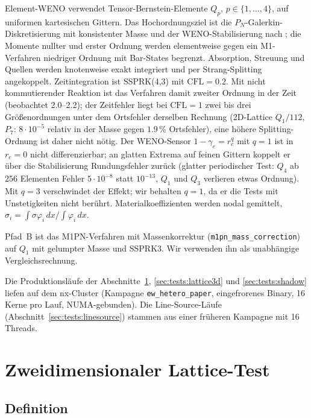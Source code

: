 Element-WENO verwendet Tensor-Bernstein-Elemente $Q_p$, $p\in\{1,\dots,4\}$, auf uniformen
kartesischen Gittern. Das Hochordnungsziel ist die $P_N$-Galerkin-Diskretisierung mit konsistenter
Masse und der WENO-Stabilisierung nach \cite{kuzmin_hajduk_vedral_2025}; die Momente nullter und
erster Ordnung werden elementweise gegen ein M1-Verfahren niedriger Ordnung mit Bar-States
\cite{moujaes_2025} begrenzt. Absorption, Streuung und Quellen werden knotenweise exakt integriert
und per Strang-Splitting angekoppelt. Zeitintegration ist SSPRK(4,3) mit $\mathrm{CFL}=0.2$.
Mit nicht kommutierender Reaktion ist das Verfahren damit zweiter Ordnung in der Zeit (beobachtet
2.0--2.2); der Zeitfehler liegt bei $\mathrm{CFL}=1$ zwei bis drei Größenordnungen unter dem
Ortsfehler derselben Rechnung (2D-Lattice $Q_1/112$, $P_7$: $8\cdot10^{-5}$ relativ in der Masse gegen
$1.9\,\%$ Ortsfehler), eine höhere Splitting-Ordnung ist daher nicht nötig.
Der WENO-Sensor $1-\gamma_e=r_e^q$ mit $q=1$ ist in $r_e=0$ nicht differenzierbar; an glatten Extrema
auf feinen Gittern koppelt er über die Stabilisierung Rundungsfehler zurück (glatter periodischer
Test: $Q_4$ ab $256$ Elementen Fehler $5\cdot10^{-8}$ statt $10^{-13}$, $Q_1$ und $Q_3$ verlieren
etwas Ordnung). Mit $q=3$ verschwindet der Effekt; wir behalten $q=1$, da er die Tests mit
Unstetigkeiten nicht berührt.
Materialkoeffizienten werden nodal gemittelt,
$\sigma_i=\int\sigma\varphi_i\,dx\big/\int\varphi_i\,dx$.

Pfad~B ist das M1PN-Verfahren mit Massenkorrektur (\texttt{m1pn\_mass\_correction}) auf $Q_1$ mit
gelumpter Masse und SSPRK3. Wir verwenden ihn als unabhängige Vergleichsrechnung.

Die Produktionsläufe der Abschnitte~\ref{sec:tests:lattice}, \ref{sec:tests:lattice3d} und
\ref{sec:tests:shadow} liefen auf dem nx-Cluster (Kampagne \texttt{ew\_hetero\_paper}, eingefrorenes
Binary, 16 Kerne pro Lauf, NUMA-gebunden). Die Line-Source-Läufe
(Abschnitt~\ref{sec:tests:linesource}) stammen aus einer früheren Kampagne mit 16 Threads.

\section{Zweidimensionaler Lattice-Test}
\label{sec:tests:lattice}

\subsection{Definition}


